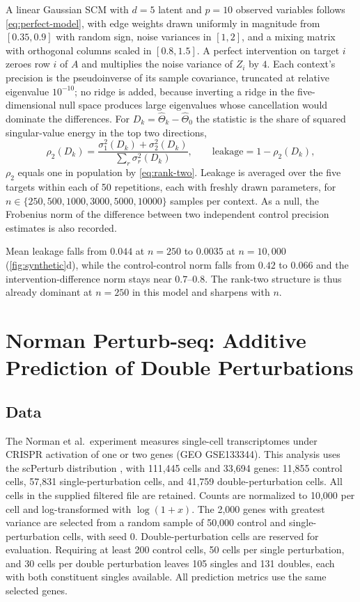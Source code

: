 \documentclass{article}
\begin{document}
A linear Gaussian SCM with $d=5$ latent and $p=10$ observed variables follows \cref{eq:perfect-model}, with edge weights drawn uniformly in magnitude from $[0.35,0.9]$ with random sign, noise variances in $[1,2]$, and a mixing matrix with orthogonal columns scaled in $[0.8,1.5]$. A perfect intervention on target $i$ zeroes row $i$ of $A$ and multiplies the noise variance of $Z_i$ by $4$. Each context's precision is the pseudoinverse of its sample covariance, truncated at relative eigenvalue $10^{-10}$; no ridge is added, because inverting a ridge in the five-dimensional null space produces large eigenvalues whose cancellation would dominate the differences. For $D_k=\widehat\Theta_k-\widehat\Theta_0$ the statistic is the share of squared singular-value energy in the top two directions,
\begin{equation}
    \rho_2(D_k)=
    \frac{\sigma_1^2(D_k)+\sigma_2^2(D_k)}
         {\sum_r\sigma_r^2(D_k)},
    \qquad
    \text{leakage}=1-\rho_2(D_k),
    \label{eq:rho2}
\end{equation}
$\rho_2$ equals one in population by \cref{eq:rank-two}. Leakage is averaged over the five targets within each of 50 repetitions, each with freshly drawn parameters, for $n\in\{250,500,1000,3000,5000,10000\}$ samples per context. As a null, the Frobenius norm of the difference between two independent control precision estimates is also recorded.

Mean leakage falls from $0.044$ at $n=250$ to $0.0035$ at $n=10{,}000$ (\cref{fig:synthetic}d), while the control-control norm falls from $0.42$ to $0.066$ and the intervention-difference norm stays near $0.7$--$0.8$. The rank-two structure is thus already dominant at $n=250$ in this model and sharpens with $n$.

\section{Norman Perturb-seq: Additive Prediction of Double Perturbations}
\label{sec:norman}

\subsection{Data}

The Norman et al.\ experiment \citep{norman2019exploring} measures single-cell transcriptomes under CRISPR activation of one or two genes (GEO GSE133344). This analysis uses the scPerturb distribution \citep{scperturb2022data}, with 111,445 cells and 33,694 genes: 11,855 control cells, 57,831 single-perturbation cells, and 41,759 double-perturbation cells. All cells in the supplied filtered file are retained. Counts are normalized to 10,000 per cell and log-transformed with $\log(1+x)$. The 2,000 genes with greatest variance are selected from a random sample of 50,000 control and single-perturbation cells, with seed 0. Double-perturbation cells are reserved for evaluation. Requiring at least 200 control cells, 50 cells per single perturbation, and 30 cells per double perturbation leaves 105 singles and 131 doubles, each with both constituent singles available. All prediction metrics use the same selected genes.
\end{document}
